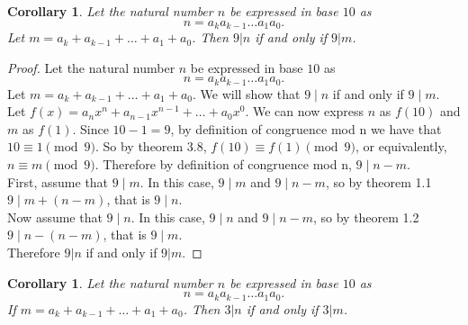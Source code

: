 \documentclass[12pt,leqno]{article}
\numberwithin{equation}{section}
\newtheorem{cor}[thm]{Corollary}
\theoremstyle{definition}
\begin{document}
\pagebreak
\begin{cor}
Let the natural number $n$ be expressed in base $10$ as
\[n = a_k a_{k-1} \hdots a_1 a_0. \]
 Let $m = a_k + a_{k-1} + \hdots + a_1 + a_0$. Then $9|n$ if and only if $9|m$.
\end{cor}

\begin{proof}[Proof]
Let the natural number $n$ be expressed in base $10$ as
\[n = a_k a_{k-1} \hdots a_1 a_0. \]
Let $m = a_k + a_{k-1} + \hdots + a_1 + a_0$. We will show that $9 \mid n$ if and only if $9 \mid m$.\\

Let $f(x) = a_nx^n + a_{n-1}x^{n-1} + \hdots + a_0x^0$.  We can now express $n$ as $f(10)$ and $m$ as $f(1)$.  Since $10 - 1 = 9$, by definition of congruence mod n we have that $10 \equiv 1 \pmod{9}$.  So by theorem 3.8, $f(10) \equiv f(1) \pmod{9}$, or equivalently, $n \equiv m \pmod{9}$.  Therefore by definition of congruence mod n, $9 \mid n - m$.\\

First, assume that $9 \mid m$.  In this case, $9 \mid m$ and $9 \mid n-m$, so by theorem 1.1 $9 \mid m + (n-m)$, that is $9\mid n$.\\

Now assume that $9 \mid n$.  In this case, $9 \mid n$ and $9 \mid n-m$, so by theorem 1.2 $9 \mid n - (n-m)$, that is $9\mid m$.\\

Therefore $9|n$ if and only if $9|m$.
\end{proof}


\pagebreak
\begin{cor}
Let the natural number $n$ be expressed in base $10$ as
\[n = a_k a_{k-1} \hdots a_1 a_0. \]
If $m = a_k + a_{k-1} + \hdots + a_1 + a_0$. Then $3|n$ if and only
if $3|m$.
\end{cor}
\end{document}
